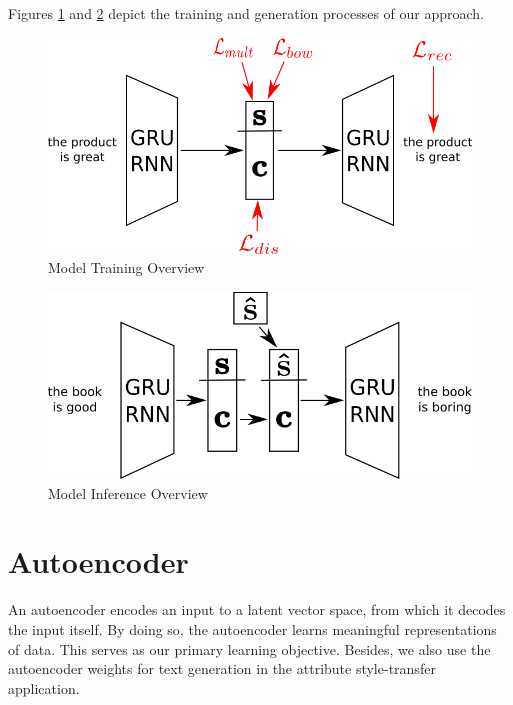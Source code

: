 Figures \ref{fig:model-overview-training} and \ref{fig:model-overview-inference} depict the training and generation processes of our approach.

\begin{figure}[ht]
	\centering
	\includegraphics[width=\linewidth]{images/model-overview-training}
	\caption{Model Training Overview}
	\label{fig:model-overview-training}
\end{figure}

\begin{figure}[ht]
	\centering
	\includegraphics[width=\linewidth]{images/model-overview-inference}
	\caption{Model Inference Overview}
	\label{fig:model-overview-inference}
\end{figure}


\section{Autoencoder} \label{sec:seq2seq-objective}

An autoencoder encodes an input to a latent vector space, from which it decodes the input itself. By doing so, the autoencoder learns meaningful representations of data. This serves as our primary learning objective. Besides, we also use the autoencoder weights for text generation in the attribute style-transfer application.

